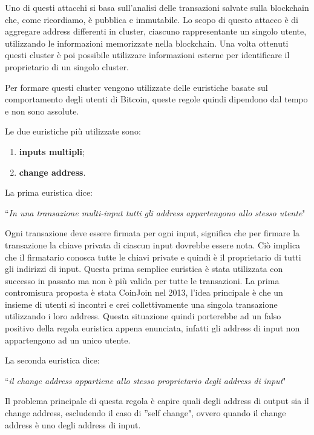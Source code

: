 Uno di questi attacchi si basa sull'analisi delle transazioni salvate sulla blockchain che, come ricordiamo, è pubblica e immutabile. Lo scopo di questo attacco è di aggregare address differenti in cluster, ciascuno rappresentante un singolo utente, utilizzando le informazioni memorizzate nella blockchain. Una volta ottenuti questi cluster è poi possibile utilizzare informazioni esterne per identificare il proprietario di un singolo cluster. 

Per formare questi cluster vengono utilizzate delle euristiche basate sul comportamento degli utenti di Bitcoin, queste regole quindi dipendono dal tempo e non sono assolute. 

Le due euristiche più utilizzate sono:
\begin{enumerate}
    \item \textbf{inputs multipli};
    \item \textbf{change address}.
\end{enumerate}

La prima euristica dice:
\begin{center}
    ``\textit{In una transazione multi-input tutti gli address appartengono allo stesso utente}"
\end{center}

Ogni transazione deve essere firmata per ogni input, significa che per firmare la transazione la chiave privata di ciascun input dovrebbe essere nota. Ciò implica che il firmatario conosca tutte le chiavi private e quindi è il proprietario di tutti gli indirizzi di input. Questa prima semplice euristica è stata utilizzata con successo in passato ma non è più valida per tutte le transazioni. La prima contromisura proposta è stata CoinJoin \cite{coinjoin} nel 2013, l'idea principale è che un insieme di utenti si incontri e crei collettivamente una singola transazione utilizzando i loro address. Questa situazione quindi porterebbe ad un falso positivo della regola euristica appena enunciata, infatti gli address di input non appartengono ad un unico utente.

La seconda euristica dice: 
\begin{center}
    ``\textit{il change address appartiene allo stesso proprietario degli address di input}"
\end{center}

Il problema principale di questa regola è capire quali degli address di output sia il change address, escludendo il caso di ''self change", ovvero quando il change address è uno degli address di input. 

